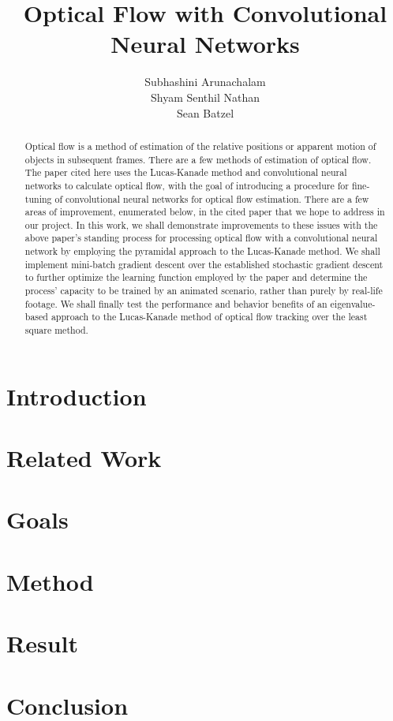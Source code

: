 \documentclass[]{article}
\title{Optical Flow with Convolutional Neural Networks}
\author{Subhashini Arunachalam\\Shyam Senthil Nathan\\Sean Batzel}
\begin{document}
\maketitle

\nocite{*}

\pagebreak
\begin{abstract}
    Optical flow is a method of estimation of the relative positions or apparent motion of objects in
subsequent frames. There are a few methods of estimation of optical flow. The paper cited here uses the
Lucas-Kanade method and convolutional neural networks to calculate optical flow, with the goal of
introducing a procedure for fine-tuning of convolutional neural networks for optical flow estimation.
There are a few areas of improvement, enumerated below, in the cited paper that we hope to address in
our project. In this work, we shall demonstrate improvements to these issues with the above paper’s
standing process for processing optical flow with a convolutional neural network by employing the
pyramidal approach to the Lucas-Kanade method. We shall implement mini-batch gradient descent over
the established stochastic gradient descent to further optimize the learning function employed by the
paper and determine the process’ capacity to be trained by an animated scenario, rather than purely by
real-life footage. We shall finally test the performance and behavior benefits of an eigenvalue-based
approach to the Lucas-Kanade method of optical flow tracking over the least square method.
\end{abstract}

\section{Introduction}

\section{Related Work}

\section{Goals}

\section{Method}

\section{Result}

\section{Conclusion}

\pagebreak
\listoftables
\listoffigures
\printbibliography[heading=bibintoc]{}
\end{document}
